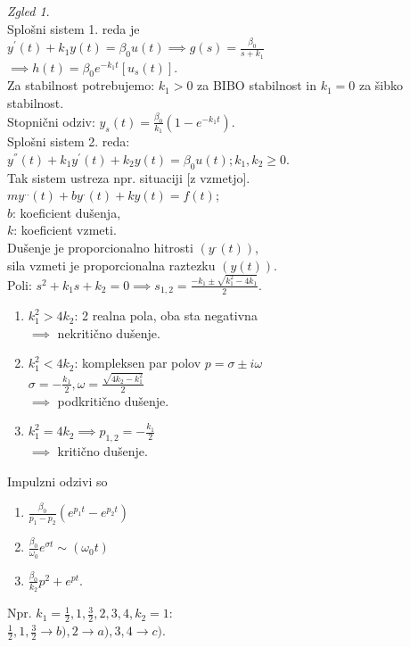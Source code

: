 \documentclass[a4paper, 12pt]{book}
\theoremstyle{definition}
\theoremstyle{remark}
\newtheorem*{exmp}{Zgled}
\begin{document}
\begin{exmp} \text{} \\
  Splošni sistem 1. reda je \\
  $y^{'}(t) + k_1 y(t) = \beta_0 u(t) \implies g(s) = \frac{\beta_0}{s+k_1}$ \\
  $\implies h(t) = \beta_0 e^{-k_1 t} [u_s(t)]$. \\
  Za stabilnost potrebujemo: $k_1 > 0$ za BIBO stabilnost in $k_1 = 0$ za šibko stabilnost. \\
  Stopnični odziv: $y_s(t) = \frac{\beta_0}{k_1} \left(1 - e^{-k_1 t}\right)$. \\
  Splošni sistem 2. reda: \\
  $y^{''}(t) + k_1 y^{'}(t) + k_2 y(t) = \beta_0 u(t); k_1, k_2 \geq 0$. \\
  Tak sistem ustreza npr. situaciji [z vzmetjo]. \\
  $m y^{..}(t) + b y^{.}(t) + k y(t) = f(t)$; \\
  $b$: koeficient dušenja, \\
  $k$: koeficient vzmeti. \\
  Dušenje je proporcionalno hitrosti $(y^{.}(t))$, \\
  sila vzmeti je proporcionalna raztezku $(y(t))$. \\
  Poli: $s^2 + k_1 s + k_2 = 0 \implies s_{1,2} =
  \frac{-k_1 \pm \sqrt{k_1^2 - 4k_1}}{2}$.
  \begin{enumerate}[label=\alph*)]
      \item $k_1^2 > 4k_2$: 2 realna pola, oba sta negativna \\
          $\implies$ nekritično dušenje.
      \item $k_1^2 < 4k_2$: kompleksen par polov $p = \sigma \pm i \omega$ \\
          $\sigma = -\frac{k_1}{2}, \omega = \frac{\sqrt{4k_2 - k_1^2}}{2}$ \\
          $\implies$ podkritično dušenje.
      \item $k_1^2 = 4k_2 \implies p_{1,2} = -\frac{k_1}{2}$ \\
          $\implies$ kritično dušenje.
  \end{enumerate}
  Impulzni odzivi so
  \begin{enumerate}[label=\alph*)]
      \item $\frac{\beta_0}{p_1-p_2} \left(e^{p_1 t} - e^{p_2 t}\right)$
      \item $\frac{\beta_0}{\omega_0} e^{\sigma t} \sim (\omega_0 t)$
      \item $\frac{\beta_0}{k_2} p^2 + e^{pt}$.
  \end{enumerate}
  Npr. $k_1 = \frac{1}{2}, 1, \frac{3}{2}, 2, 3, 4, k_2 = 1$: \\
  $\frac{1}{2}, 1, \frac{3}{2} \to b), 2 \to a), 3, 4 \to c)$.
\end{exmp}
\end{document}
